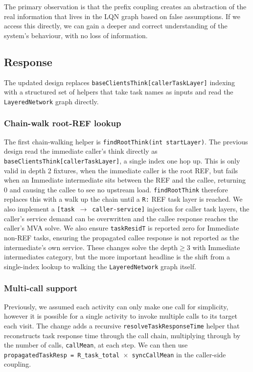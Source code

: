 The primary observation is that the prefix coupling creates an abstraction of the real information that lives in the LQN graph based on false assumptions. If we access this directly, we can gain a deeper and correct understanding of the system's behaviour, with no loss of information.


\subsection{Response}

The updated design replaces \texttt{baseClientsThink[callerTaskLayer]} indexing with a structured set of helpers that take task names as inputs and read the \texttt{LayeredNetwork} graph directly.

\subsubsection*{Chain-walk root-REF lookup}

The first chain-walking helper is \texttt{findRootThink(int startLayer)}. The previous design read the immediate caller's think directly as \texttt{baseClientsThink[callerTaskLayer]}, a single index one hop up. This is only valid in depth 2 fixtures, when the immediate caller is the root REF, but fails when an Immediate intermediate sits between the REF and the callee, returning 0 and causing the callee to see no upstream load. \texttt{findRootThink} therefore replaces this with a walk up the chain until a \texttt{R:} REF task layer is reached. We also implement a \texttt{[task $\rightarrow$ caller-service]} injection for caller task layers, the caller's service demand can be overwritten and the callee response reaches the caller's MVA solve. We also ensure \texttt{taskResidT} is reported zero for Immediate non-REF tasks, ensuring the propagated callee response is not reported as the intermediate's own service. These changes solve the depth$\geq$3 with Immediate intermediates category, but the more important headline is the shift from a single-index lookup to walking the \texttt{LayeredNetwork} graph itself.

\subsubsection*{Multi-call support}

Previously, we assumed each activity can only make one call for simplicity, however it is possible for a single activity to invoke multiple calls to its target each visit. The change adds a recursive \texttt{resolveTaskResponseTime} helper that reconstructs task response time through the call chain, multiplying through by the number of calls, \texttt{callMean}, at each step. We can then use \texttt{propagatedTaskResp = R\_task\_total $\times$ syncCallMean} in the caller-side coupling.

